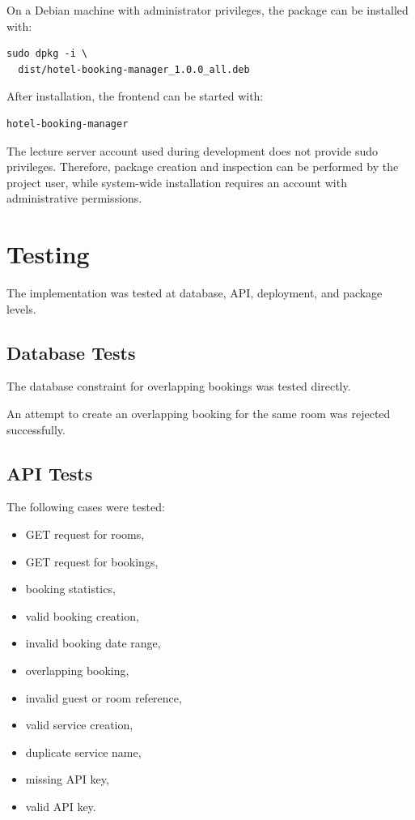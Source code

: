\documentclass[12pt,a4paper]{article}
\begin{document}
On a Debian machine with administrator privileges, the package can be
installed with:

\begin{lstlisting}
sudo dpkg -i \
  dist/hotel-booking-manager_1.0.0_all.deb
\end{lstlisting}

After installation, the frontend can be started with:

\begin{lstlisting}
hotel-booking-manager
\end{lstlisting}

The lecture server account used during development does not provide
sudo privileges. Therefore, package creation and inspection can be
performed by the project user, while system-wide installation requires
an account with administrative permissions.

\section{Testing}

The implementation was tested at database, API, deployment, and package
levels.

\subsection{Database Tests}

The database constraint for overlapping bookings was tested directly.

An attempt to create an overlapping booking for the same room was
rejected successfully.

\subsection{API Tests}

The following cases were tested:

\begin{itemize}
    \item GET request for rooms,
    \item GET request for bookings,
    \item booking statistics,
    \item valid booking creation,
    \item invalid booking date range,
    \item overlapping booking,
    \item invalid guest or room reference,
    \item valid service creation,
    \item duplicate service name,
    \item missing API key,
    \item valid API key.
\end{itemize}
\end{document}
